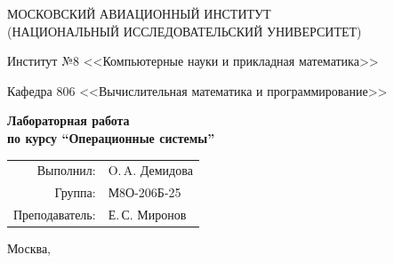 \begin{titlepage}
\begin{center}
\large
МОСКОВСКИЙ АВИАЦИОННЫЙ ИНСТИТУТ\\ (НАЦИОНАЛЬНЫЙ ИССЛЕДОВАТЕЛЬСКИЙ УНИВЕРСИТЕТ)

\vspace{20pt}

Институт №8 <<Компьютерные науки и прикладная математика>>

Кафедра 806 <<Вычислительная математика и программирование>>
\end{center}

\vspace{60pt}

\begin{center}
\bfseries
\large
Лабораторная работа  \\по курсу \enquote{Операционные системы}

\vspace{54pt}

\end{center}

\vfill

\begin{flushright}
\large
\begin{tabular}{rl}
Выполнил: & O.\,A. Демидова \\
Группа: & М8О-206Б-25 \\
Преподаватель: & Е.\,С. Миронов \\
\end{tabular}
\end{flushright}

\vspace{92pt}

\begin{center}
\large
Москва, \the\year
\end{center}
\end{titlepage}

\pagebreak
